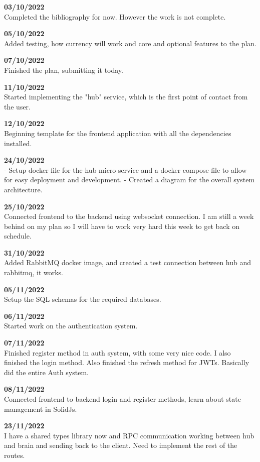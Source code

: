 \documentclass[titlepage]{article}
\begin{document}
\textbf{03/10/2022} \\
Completed the bibliography for now. However the work is not complete.

\textbf{05/10/2022} \\
Added testing, how currency will work and core and optional features to the plan.

\textbf{07/10/2022} \\
Finished the plan, submitting it today.

\textbf{11/10/2022} \\
Started implementing the "hub" service, which is the first point of contact from the user.

\textbf{12/10/2022} \\
Beginning template for the frontend application with all the dependencies installed.

\textbf{24/10/2022} \\
- Setup docker file for the hub micro service and a docker compose file to allow for easy deployment and development.
- Created a diagram for the overall system architecture.

\textbf{25/10/2022} \\
Connected frontend to the backend using websocket connection. I am still a week behind on my plan so I will have to work very hard this week to get back on schedule.

\textbf{31/10/2022} \\
Added RabbitMQ docker image, and created a test connection between hub and rabbitmq, it works.

\textbf{05/11/2022} \\
Setup the SQL schemas for the required databases.

\textbf{06/11/2022} \\
Started work on the authentication system.

\textbf{07/11/2022} \\
Finished register method in auth system, with some very nice code.
I also finished the login method.
Also finished the refresh method for JWTs. Basically did the entire Auth system.

\textbf{08/11/2022} \\
Connected frontend to backend login and register methods, learn about state management in SolidJs.

\textbf{23/11/2022} \\
I have a shared types library now and RPC communication working between hub and brain and sending back to the client. Need to implement the rest of the routes.
\end{document}
